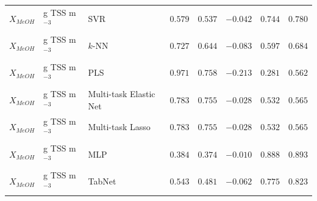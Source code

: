 \begin{longtable}{llp{3.1cm}rrrrr}
$X_{MeOH}$ & g TSS m$^{-3}$ & SVR & $0.579$ & $0.537$ & $-0.042$ & $0.744$ & $0.780$ \\
$X_{MeOH}$ & g TSS m$^{-3}$ & $k$-NN & $0.727$ & $0.644$ & $-0.083$ & $0.597$ & $0.684$ \\
$X_{MeOH}$ & g TSS m$^{-3}$ & PLS & $0.971$ & $0.758$ & $-0.213$ & $0.281$ & $0.562$ \\
$X_{MeOH}$ & g TSS m$^{-3}$ & Multi-task Elastic Net & $0.783$ & $0.755$ & $-0.028$ & $0.532$ & $0.565$ \\
$X_{MeOH}$ & g TSS m$^{-3}$ & Multi-task Lasso & $0.783$ & $0.755$ & $-0.028$ & $0.532$ & $0.565$ \\
$X_{MeOH}$ & g TSS m$^{-3}$ & MLP & $0.384$ & $0.374$ & $-0.010$ & $0.888$ & $0.893$ \\
$X_{MeOH}$ & g TSS m$^{-3}$ & TabNet & $0.543$ & $0.481$ & $-0.062$ & $0.775$ & $0.823$ \\
\end{longtable}
